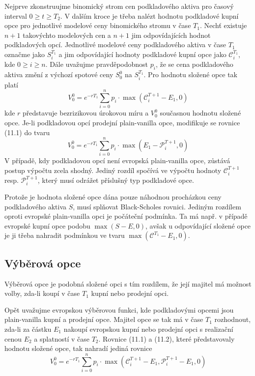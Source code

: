 \documentclass[a4paper]{book}
\begin{document}
Nejprve zkonstruujme binomický strom cen podkladového aktiva pro časový interval $0 \ge t \ge T_2$. V dalším kroce je třeba nalézt hodnotu podkladové kupní opce pro jednotlivé modelové ceny binomického stromu v čase $T_1$. Nechť existuje $n + 1$ takovýchto modelových cen a $n + 1$ jim odpovídajících hodnot podkladových opcí. Jednotlivé modelové ceny podkladového aktiva v čase $T_1$ označme jako $S_i^{T_1}$ a jim odpovídající hodnoty podkladové kupní opce jako $\mathcal{C}_i^{T_1}$, kde $0 \ge i \ge n$. Dále uvažujme pravděpodobnost $p_i$, že se cena podkladového aktiva změní z výchozí spotové ceny $S_0^0$ na $S_i^{T_1}$. Pro hodnotu složené opce tak platí
\begin{equation}
V_0^0 = e^{-r T_1} \sum_{i = 0}^n p_i \cdot \max(\mathcal{C}_i^{T+1} - E_1, 0)
\end{equation}
kde $r$ představuje bezrizikovou úrokovou míru a $V_0^0$ současnou hodnotu složené opce. Je-li podkladovou opcí prodejní plain-vanilla opce, modifikuje se rovnice (11.1) do tvaru
\begin{equation}
V_0^0 = e^{-r T_1} \sum_{i = 0}^n p_i \cdot \max(E_1 - \mathcal{P}_i^{T+1}, 0)
\end{equation}
V případě, kdy podkladovou opcí není evropská plain-vanilla opce, zůstává postup výpočtu zcela shodný. Jediný rozdíl spočívá ve výpočtu hodnoty $\mathcal{C}_i^{T+1}$ resp. $\mathcal{P}_i^{T+1}$, který musí odrážet příslušný typ podkladové opce.

Protože je hodnota složené opce dána pouze náhodnou procházkou ceny podkladového aktiva $S$, musí splňovat Black-Scholes rovnici. Jediným rozdílem oproti evropské plain-vanilla opci je počáteční podmínka. Ta má např. v případě evropské kupní opce podobu $\max(S - E, 0)$, avšak u odpovídající složené opce je ji třeba nahradit podmínkou ve tvaru $\max(\mathcal{C}^{T_1} - E_1, 0)$.  

\subsection{Výběrová opce}

Výběrová opce je podobná složené opci s tím rozdílem, že její majitel má možnost volby, zda-li koupí v čase $T_1$ kupní nebo prodejní opci.

Opět uvažujme evropskou výběrovou funkci, kde podkladovými opcemi jsou plain-vanilla kupní a prodejní opce. Majitel opce se tak má v čase $T_1$ rozhodnout, zda-li za částku $E_1$ nakoupí evropskou kupní nebo prodejní opci s realizační cenou $E_2$ a splatností v čase $T_2$. Rovnice (11.1) a (11.2), které představovaly hodnotu složené opce, tak nahradí jediná rovnice 
\begin{equation}
V_0^0 = e^{-r T_1} \sum_{i = 0}^n p_i \cdot \max(\mathcal{C}_i^{T+1} - E_1, \mathcal{P}_i^{T+1} - E_1, 0)
\end{equation}
\end{document}
